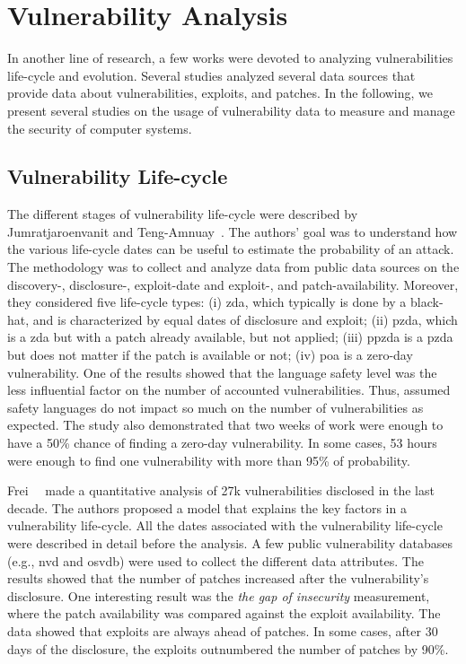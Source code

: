 \section{Vulnerability Analysis}


In another line of research, a few works were devoted to analyzing vulnerabilities life-cycle and evolution.
Several studies analyzed several data sources that provide data about vulnerabilities, exploits, and patches.
In the following, we present several studies on the usage of vulnerability data to measure and manage the security of computer systems.

\subsection{Vulnerability Life-cycle}

The different stages of vulnerability life-cycle were described by Jumratjaroenvanit and Teng-Amnuay~\cite{Jumratjaroenvanit:2008}.
The authors' goal was to understand how the various life-cycle dates can be useful to estimate the probability of an attack. 
The methodology was to collect and analyze data from public data sources on the discovery-, disclosure-, exploit-date and exploit-, and patch-availability. 
Moreover, they considered five life-cycle types: (i) \gls{zda}, which typically is done by a black-hat, and is characterized by equal dates of disclosure and exploit; (ii) \gls{pzda}, which is a \gls{zda} but with a patch already available, but not applied; 
(iii) \gls{ppzda} is a \gls{pzda} but does not matter if the patch is available or not; 
(iv) \gls{poa} is a zero-day vulnerability. 
One of the results showed that the language safety level was the less influential factor on the number of accounted vulnerabilities.
Thus, assumed safety languages do not impact so much on the number of vulnerabilities as expected.
The study also demonstrated that two weeks of work were enough to have a 50\% chance of finding a zero-day vulnerability. 
In some cases, 53 hours were enough to find one vulnerability with more than 95\% of probability.


Frei~\etal{}~\cite{Frei:2010} made a quantitative analysis of 27k vulnerabilities disclosed in the last decade.
The authors proposed a model that explains the key factors in a vulnerability life-cycle.
All the dates associated with the vulnerability life-cycle were described in detail before the analysis.
A few public vulnerability databases (e.g., \gls{nvd} and \gls{osvdb}) were used to collect the different data attributes.
The results showed that the number of patches increased after the vulnerability's disclosure.  
One interesting result was the \emph{the gap of insecurity} measurement, where the patch availability was compared against the exploit availability. 
The data showed that exploits are always ahead of patches.
In some cases, after 30 days of the disclosure, the exploits outnumbered the number of patches by 90\%.


